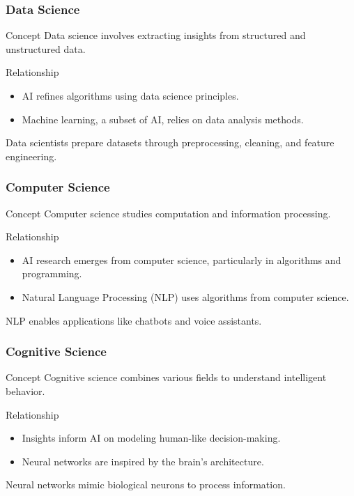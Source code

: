 \documentclass[aspectratio=169]{beamer}
\begin{document}
\begin{frame}[fragile]
    \frametitle{Data Science}
    \begin{block}{Concept}
        Data science involves extracting insights from structured and unstructured data.
    \end{block}
    \begin{block}{Relationship}
        \begin{itemize}
            \item AI refines algorithms using data science principles.
            \item Machine learning, a subset of AI, relies on data analysis methods.
        \end{itemize}
    \end{block}
    \begin{example}
        Data scientists prepare datasets through preprocessing, cleaning, and feature engineering.
    \end{example}
\end{frame}

\begin{frame}[fragile]
    \frametitle{Computer Science}
    \begin{block}{Concept}
        Computer science studies computation and information processing.
    \end{block}
    \begin{block}{Relationship}
        \begin{itemize}
            \item AI research emerges from computer science, particularly in algorithms and programming.
            \item Natural Language Processing (NLP) uses algorithms from computer science.
        \end{itemize}
    \end{block}
    \begin{example}
        NLP enables applications like chatbots and voice assistants.
    \end{example}
\end{frame}

\begin{frame}[fragile]
    \frametitle{Cognitive Science}
    \begin{block}{Concept}
        Cognitive science combines various fields to understand intelligent behavior.
    \end{block}
    \begin{block}{Relationship}
        \begin{itemize}
            \item Insights inform AI on modeling human-like decision-making.
            \item Neural networks are inspired by the brain's architecture.
        \end{itemize}
    \end{block}
    \begin{example}
        Neural networks mimic biological neurons to process information.
    \end{example}
\end{frame}
\end{document}
